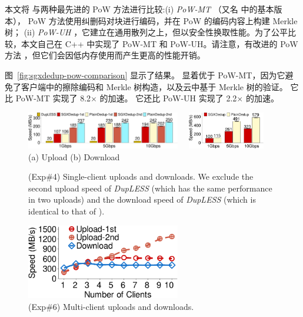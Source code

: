 本文将 \sysnameS 与两种最先进的 PoW 方法进行比较:(i) \textit{ PoW-MT} \cite{halevi11}（又名 \cite{halevi11} 中的基本版本）， PoW 方法使用纠删码对块进行编码，并在 PoW 的编码内容上构建 Merkle 树； (ii) \textit{ PoW-UH} \cite{xu2013weak}，它建立在通用散列之上，但以安全性换取性能。为了公平比较，本文自己在 C++ 中实现了 PoW-MT 和 PoW-UH。请注意，有改进的 PoW 方法 \cite{halevi11}，但它们会因低内存使用而产生更高的性能开销。


图~\ref{fig:sgxdedup-pow-comparison} 显示了结果。 \sysnameS 显着优于 PoW-MT，因为它避免了客户端中的擦除编码和 Merkle 树构造，以及云中基于 Merkle 树的验证。 它比 PoW-MT 实现了 8.2$\times$ 的加速。 它还比 PoW-UH 实现了 2.2$\times$ 的加速。


\begin{figure}[t]
  \centering
  \includegraphics[width=0.6\textwidth]{pic/sgxdedup/upload_network_speed_bar.pdf} \ \ 
  \includegraphics[width=0.3\textwidth]{pic/sgxdedup/download_network_speed_bar.pdf}
  \vspace{-3pt}\\
    \hspace{1.1in} {\small (a) Upload} \hspace{1.9in}
  {\small (b) Download}
  \vspace{-6pt}\\
  \caption{(Exp\#4) Single-client uploads and downloads. We exclude the second upload speed of {\em DupLESS} (which has the same performance in two uploads) and the download speed of {\em DupLESS} (which is identical to that of  \sysnameS).}
  \label{fig:sgxdedup-singleClientThroughput}
\end{figure}

\begin{figure}[t]
  \centering
  \includegraphics[width=0.6\textwidth]{pic/sgxdedup/expb1_multiple_client.pdf}  
  \caption{(Exp\#6) Multi-client uploads and downloads.}
  \label{fig:sgxdedup-multiClientThroughput}
\end{figure}

